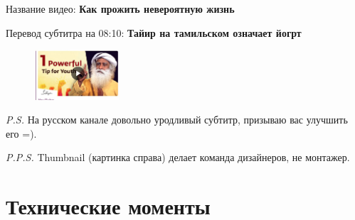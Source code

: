 \documentclass[
a4paper, %
12pt, %
article,
onecolumn, %
openany, %
]{memoir}
\begin{document}
Название видео: \textbf{Как прожить невероятную жизнь}
	
Перевод субтитра на 08:10: \textbf{Тайир на тамильском означает йогрт}


\begin{figure}
  \begin{center}
    \includegraphics[width=0.28\textwidth]{thumbnail}
  \end{center}
\end{figure}

\emph{P.S.} На русском канале довольно уродливый субтитр, призываю вас улучшить его =).

\emph{P.P.S.} Thumbnail (картинка справа) делает команда дизайнеров, не монтажер.
 

\newpage
\section{Технические моменты}
\end{document}

